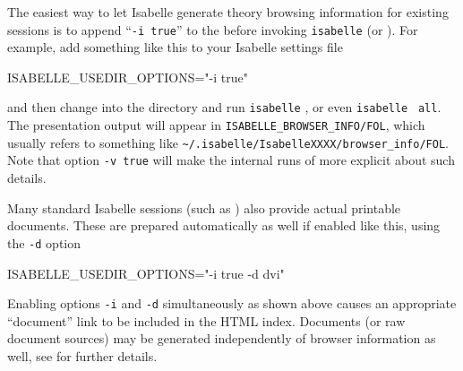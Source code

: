 \begin{isabellebody}
\begin{isamarkuptext}
  \medskip

  The easiest way to let Isabelle generate theory browsing information
  for existing sessions is to append ``\verb|-i true|'' to the
  \hyperlink{setting.ISABELLE-USEDIR-OPTIONS}{\mbox{}} before invoking \verb|isabelle| \hyperlink{tool.make}{\mbox{}} (or \hyperlink{file.$ISABELLE-HOME/build}{\mbox{}}).  For
  example, add something like this to your Isabelle settings file

\begin{ttbox}
ISABELLE_USEDIR_OPTIONS="-i true"
\end{ttbox}

  and then change into the \hyperlink{file.~~/src/FOL}{\mbox{}} directory and run
  \verb|isabelle| \hyperlink{tool.make}{\mbox{}}, or even \verb|isabelle|
  \hyperlink{tool.make}{\mbox{}}~\verb|all|.  The presentation output will appear
  in \verb|ISABELLE_BROWSER_INFO/FOL|, which usually refers to
  something like \verb|~/.isabelle/IsabelleXXXX/browser_info/FOL|.  Note that option
  \verb|-v true| will make the internal runs of \hyperlink{tool.usedir}{\mbox{}}
  more explicit about such details.

  Many standard Isabelle sessions (such as \hyperlink{file.~~/src/HOL/ex}{\mbox{}})
  also provide actual printable documents.  These are prepared
  automatically as well if enabled like this, using the \verb|-d| option
\begin{ttbox}
ISABELLE_USEDIR_OPTIONS="-i true -d dvi"
\end{ttbox}
  Enabling options \verb|-i| and \verb|-d|
  simultaneously as shown above causes an appropriate ``document''
  link to be included in the HTML index.  Documents (or raw document
  sources) may be generated independently of browser information as
  well, see  for further details.


\end{isamarkuptext}
\end{isabellebody}
